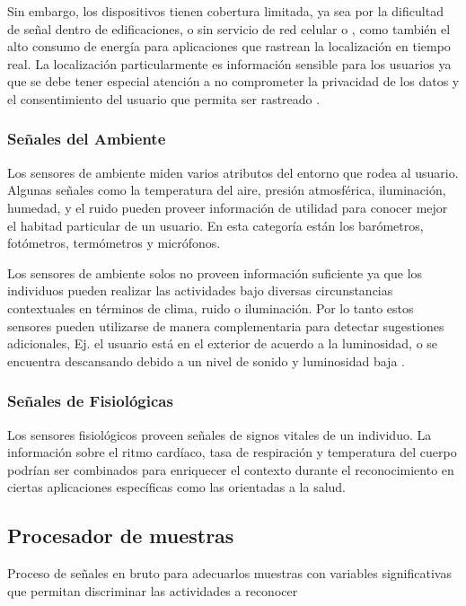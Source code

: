 Sin embargo, los dispositivos  tienen cobertura limitada,
ya sea por la dificultad de señal dentro de edificaciones, o sin servicio
de red celular o , como también el alto consumo de energía
para aplicaciones que rastrean la localización en tiempo real. La
localización particularmente es información sensible para los usuarios
ya que se debe tener especial atención a no comprometer la privacidad
de los datos y el consentimiento del usuario que permita ser rastreado
\cite{LaraLabrador2013}.

\subsubsection{Señales del Ambiente}

Los sensores de ambiente miden varios atributos del entorno que rodea
al usuario. Algunas señales como la temperatura del aire, presión
atmosférica, iluminación, humedad, y el ruido pueden proveer información
de utilidad para conocer mejor el habitad particular de un usuario.
En esta categoría están los barómetros, fotómetros, termómetros y
micrófonos.

Los sensores de ambiente solos no proveen información suficiente ya
que los individuos pueden realizar las actividades bajo diversas circunstancias
contextuales en términos de clima, ruido o iluminación. Por lo tanto
estos sensores pueden utilizarse de manera complementaria para detectar
sugestiones adicionales, Ej. el usuario está en el exterior de acuerdo
a la luminosidad, o se encuentra descansando debido a un nivel de
sonido y luminosidad baja \cite{LaraLabrador2013}.

\subsubsection{Señales de Fisiológicas}

Los sensores fisiológicos proveen señales de signos vitales de un
individuo. La información sobre el ritmo cardíaco, tasa de respiración
y temperatura del cuerpo podrían ser combinados para enriquecer el
contexto durante el reconocimiento en ciertas aplicaciones específicas
como las orientadas a la salud.

\subsection{Procesador de muestras}

\label{sec422:proceso-se=0000F1ales}Proceso de señales en bruto para
adecuarlos muestras con variables significativas que permitan discriminar
las actividades a reconocer

